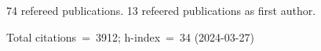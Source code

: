 74 refereed publications. 13 refeered publications as first author.

Total citations~=~3912; h-index~=~34 (2024-03-27)